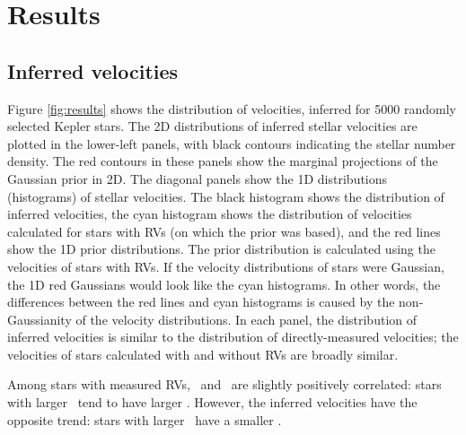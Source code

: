 \section{Results}
\label{sec:results}

\subsection{Inferred velocities}

Figure \ref{fig:results} shows the distribution of velocities, inferred for
5000 randomly selected Kepler stars.
The 2D distributions of inferred stellar velocities are plotted in the
lower-left panels, with black contours indicating the stellar number density.
The red contours in these panels show the marginal projections of the
Gaussian prior in 2D.
The diagonal panels show the 1D distributions (histograms) of stellar
velocities.
The black histogram shows the distribution of inferred velocities, the cyan
histogram shows the distribution of velocities calculated for stars with RVs
(on which the prior was based), and the red lines show the 1D prior
distributions.
The prior distribution is calculated using the velocities of stars with RVs.
If the velocity distributions of stars were Gaussian, the 1D red Gaussians
would look like the cyan histograms.
In other words, the differences between the red lines and cyan histograms
is caused by the non-Gaussianity of the velocity distributions.
In each panel, the distribution of inferred velocities is similar to the
distribution of directly-measured velocities; the velocities of stars
calculated with and without RVs are broadly similar.

Among stars with measured RVs, \vy\ and \vz\ are slightly positively
correlated: stars with larger \vy\ tend to have larger \vz.
However, the inferred velocities have the opposite trend: stars with larger
\vy\ have a smaller \vz.

